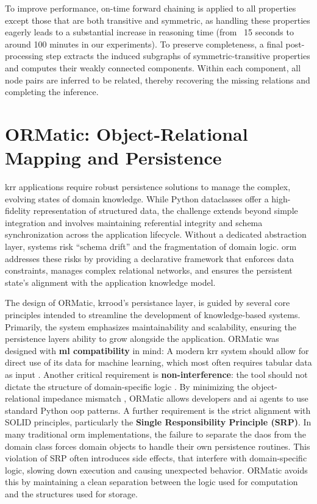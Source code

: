 \documentclass{article}
\begin{document}
To improve performance, on-time forward chaining is applied to all properties except those that are both transitive and symmetric, as handling these properties eagerly leads to a substantial increase in reasoning time (from ~15 seconds to around 100 minutes in our experiments). To preserve completeness, a final post-processing step extracts the induced subgraphs of symmetric-transitive properties and computes their weakly connected components. Within each component, all node pairs are inferred to be related, thereby recovering the missing relations and completing the inference. 

\section{ORMatic: Object-Relational Mapping and Persistence}
\label{sec:ormatic}

\Ac{krr} applications require robust persistence solutions to manage the complex, evolving states of domain knowledge. While Python dataclasses offer a high-fidelity representation of structured data, the challenge extends beyond simple integration and involves maintaining referential integrity and schema synchronization across the application lifecycle. Without a dedicated abstraction layer, systems risk ``schema drift'' and the fragmentation of domain logic. \Ac{orm} addresses these risks by providing a declarative framework that enforces data constraints, manages complex relational networks, and ensures the persistent state's alignment with the application knowledge model.

The design of ORMatic, \ac{krrood}'s persistance layer, is guided by several core principles intended to streamline the development of knowledge-based systems. Primarily, the system emphasizes maintainability and scalability, ensuring the persistence layers ability to grow alongside the application. ORMatic was designed with \textbf{
\ac{ml} compatibility} in mind: A modern \ac{krr} system should allow for direct use of its data for machine learning, which most often requires tabular data as input \cite{kleppmann2019designing}.
Another critical requirement is \textbf{non-interference}: the tool should not dictate the structure of domain-specific logic \cite{davis1993knowledge}. By minimizing the object-relational impedance mismatch \cite{neward2006vietnam}, ORMatic allows developers and \ac{ai} agents to use standard Python \ac{oop} patterns.
A further requirement is the strict alignment with SOLID principles, particularly the \textbf{Single Responsibility Principle (SRP)}. In many traditional \ac{orm} implementations, the failure to separate the \acp{dao} from the domain class forces domain objects to handle their own persistence routines. This violation of SRP often introduces side effects, that interfere with domain-specific logic, slowing down execution and causing unexpected behavior. ORMatic avoids this by maintaining a clean separation between the logic used for computation and the structures used for storage.
\end{document}

